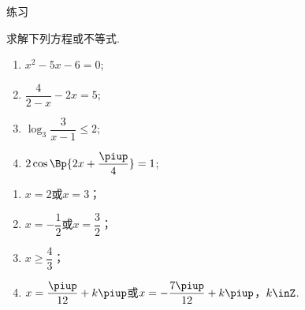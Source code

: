     \begin{exercise}{\heiti 练习}\\
      \item 求解下列方程或不等式.
        \begin{multicols}{2}\begin{enumerate}[label=\arabic*)]
            \item $x^2-5x-6=0$;
            \vspace{2cm}
            \item $\dfrac4{2-x}-2x=5$;
            \vspace{2cm}
            \item $\log_3{\dfrac3{x-1}}\leqslant2$;
            \vspace{2cm}
            \item $2\cos\Bp{2x+\dfrac{\piup}4}=1$;
            \vspace{2cm}
          \end{enumerate}
        \end{multicols}
        \begin{answer}
          \begin{enumerate}[itemindent=1em,listparindent=6em, label=\arabic*)]
            \item $x=2$或$x=3$；
            \item $x=-\dfrac12$或$x=\dfrac32$；
            \item $x\geqslant\dfrac43$；
            \item $x=\dfrac{\piup}{12}+k\piup$或$x=-\dfrac{7\piup}{12}+k\piup$，$k\inZ$.
          \end{enumerate}
        \end{answer}
      \vspace{4em}
    \end{exercise}
    \clearpage
